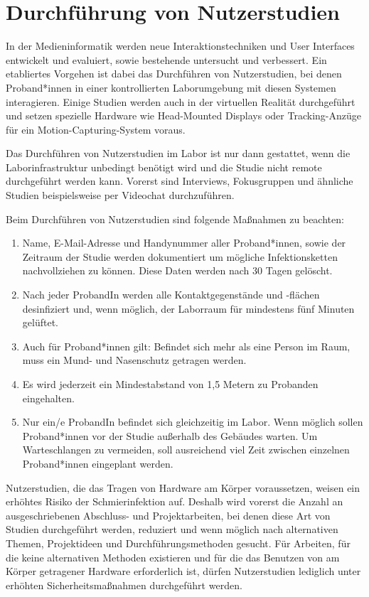 \section{Durchführung von Nutzerstudien}\label{sec:nutzerstudien}

\noindent
In der Medieninformatik werden neue Interaktionstechniken und User Interfaces entwickelt und evaluiert, sowie bestehende untersucht und verbessert.
Ein etabliertes Vorgehen ist dabei das Durchführen von Nutzerstudien, bei denen Proband*innen in einer kontrollierten Laborumgebung mit diesen Systemen interagieren.
Einige Studien werden auch in der virtuellen Realität durchgeführt und setzen spezielle Hardware wie Head-Mounted Displays oder Tracking-Anzüge für ein Motion-Capturing-System voraus.

\medskip
\noindent
Das Durchführen von Nutzerstudien im Labor ist nur dann gestattet, wenn die Laborinfrastruktur unbedingt benötigt wird und die Studie nicht remote durchgeführt werden kann.
Vorerst sind Interviews, Fokusgruppen und ähnliche Studien beispielsweise per Videochat durchzuführen.

\noindent
Beim Durchführen von Nutzerstudien sind folgende Maßnahmen zu beachten:

\begin{enumerate}
    \item Name, E-Mail-Adresse und Handynummer aller Proband*innen, sowie der Zeitraum der Studie werden dokumentiert um mögliche Infektionsketten nachvollziehen zu können. Diese Daten werden nach 30 Tagen gelöscht.
    \item Nach jeder ProbandIn werden alle Kontaktgegenstände und -flächen desinfiziert und, wenn möglich, der Laborraum für mindestens fünf Minuten gelüftet.
    \item Auch für Proband*innen gilt: Befindet sich mehr als eine Person im Raum, muss ein Mund- und Nasenschutz getragen werden.
    \item Es wird jederzeit ein Mindestabstand von 1,5 Metern zu Probanden eingehalten.
    \item Nur ein/e ProbandIn befindet sich gleichzeitig im Labor. Wenn möglich sollen Proband*innen vor der Studie außerhalb des Gebäudes warten. Um Warteschlangen zu vermeiden, soll ausreichend viel Zeit zwischen einzelnen Proband*innen eingeplant werden.
\end{enumerate}

\noindent
Nutzerstudien, die das Tragen von Hardware am Körper voraussetzen, weisen ein erhöhtes Risiko der Schmierinfektion auf.
Deshalb wird vorerst die Anzahl an ausgeschriebenen Abschluss- und Projektarbeiten, bei denen diese Art von Studien durchgeführt werden, reduziert und wenn möglich nach alternativen Themen, Projektideen und Durchführungsmethoden gesucht. Für Arbeiten, für die keine alternativen Methoden existieren und für die das Benutzen von am Körper getragener Hardware erforderlich ist, dürfen Nutzerstudien lediglich unter erhöhten Sicherheitsmaßnahmen durchgeführt werden.

